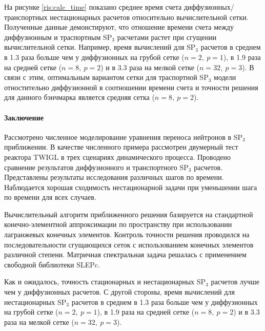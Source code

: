 \documentclass{crm-article}
\begin{document}
На рисунке \ref{ris:calc_time} показано среднее время счета диффузионных/транспортных нестационарных расчетов относительно вычислительной сетки.
Полученные данные демонстируют, что отношение времени счета между диффузионным и траспортным SP$_3$ расчетами растет при сгущении вычислительной сетки.
Например, время вычислений для SP$_3$ расчетов в среднем в 1.3 раза больше чем у диффузионных на грубой сетке ($n=2,\ p=1$), в 1.9 раза на средней сетке ($n=8,\ p=2$) и в 3.3 раза на мелкой сетке ($n=32,\ p=3$). 
В связи с этим, оптимальным вариантом сетки для траспортной SP$_3$ модели отностительно диффузионной в соотношении времени счета и точности решения для данного бэнчмарка является средняя сетка ($n=8,\ p=2$).
	
\paragraph{Заключение}

Рассмотрено численное моделирование уравнения переноса нейтронов в SP$_3$ приближении.
В качестве численного примера рассмотрен двумерный тест реактора TWIGL в трех сценариях динамического процесса.
Проводено сравнение результатов диффузионного и транспортного SP$_3$ расчетов. 
Представлены результаты исследования различных шагов по времени.
Наблюдается хорошая сходимость нестационарной задачи при уменьшении шага по времени для всех случаев.

Вычислительный алгоритм приближенного решения базируется на стандартной конечно-элементной аппроксимации по пространству при использовании лагранжевых конечных элементов.
Контроль точности решения проводился на последовательности сгущающихся сеток с использованием конечных элементов различной степени.
Матричная спектральная задача решалась с применением свободной библиотеки SLEPc.

Как и ожидалось, точность стационарных и нестационарных SP$_3$ расчетов лучше чем у диффузионных расчетов. 
С другой стороны, время вычислений для нестационарных SP$_3$ расчетов в среднем в 1.3 раза больше чем у диффузионных на грубой сетке ($n=2,\ p=1$), в 1.9 раза на средней сетке ($n=8,\ p=2$) и в 3.3 раза на мелкой сетке ($n=32,\ p=3$).
\end{document}
